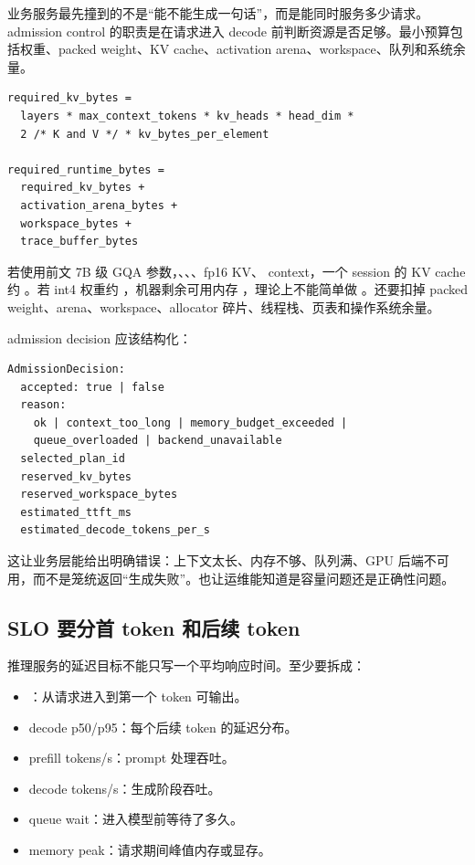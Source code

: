 业务服务最先撞到的不是“能不能生成一句话”，而是能同时服务多少请求。admission control 的职责是在请求进入 decode 前判断资源是否足够。最小预算包括权重、packed weight、KV cache、activation arena、workspace、队列和系统余量。

\begin{lstlisting}[numbers=none,caption={请求进入前的容量判断}]
required_kv_bytes =
  layers * max_context_tokens * kv_heads * head_dim *
  2 /* K and V */ * kv_bytes_per_element

required_runtime_bytes =
  required_kv_bytes +
  activation_arena_bytes +
  workspace_bytes +
  trace_buffer_bytes
\end{lstlisting}

若使用前文 7B 级 GQA 参数，、、、fp16 KV、 context，一个 session 的 KV cache 约 。若 int4 权重约 ，机器剩余可用内存 ，理论上不能简单做 。还要扣掉 packed weight、arena、workspace、allocator 碎片、线程栈、页表和操作系统余量。

admission decision 应该结构化：

\begin{lstlisting}[numbers=none,caption={AdmissionDecision 字段}]
AdmissionDecision:
  accepted: true | false
  reason:
    ok | context_too_long | memory_budget_exceeded |
    queue_overloaded | backend_unavailable
  selected_plan_id
  reserved_kv_bytes
  reserved_workspace_bytes
  estimated_ttft_ms
  estimated_decode_tokens_per_s
\end{lstlisting}

这让业务层能给出明确错误：上下文太长、内存不够、队列满、GPU 后端不可用，而不是笼统返回“生成失败”。也让运维能知道是容量问题还是正确性问题。

\subsection{SLO 要分首 token 和后续 token}

推理服务的延迟目标不能只写一个平均响应时间。至少要拆成：

\begin{itemize}
  \item {}：从请求进入到第一个 token 可输出。
  \item decode p50/p95：每个后续 token 的延迟分布。
  \item prefill tokens/s：prompt 处理吞吐。
  \item decode tokens/s：生成阶段吞吐。
  \item queue wait：进入模型前等待了多久。
  \item memory peak：请求期间峰值内存或显存。
\end{itemize}

